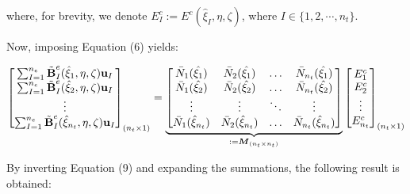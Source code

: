 \documentclass[12pt]{article}
\begin{document}
\noindent
where, for brevity, we denote $E^c_I := E^c (\hat{\xi}_I,\eta,\zeta)$, where $I \in \{ 1,2,\cdots, n_t \}$.

Now, imposing Equation (6) yields:

\begin{equation}
\begin{bmatrix}
\sum_{I=1}^{n_e} \tilde{\text{\bf{B}}}_I^e (\hat{\xi}_1, \eta, \zeta) \text{\bf{u}}_I\\
\sum_{I=1}^{n_e} \tilde{\text{\bf{B}}}_I^e (\hat{\xi}_2, \eta, \zeta) \text{\bf{u}}_I\\
\vdots \\
\sum_{I=1}^{n_e} \tilde{\text{\bf{B}}}_I^e (\hat{\xi}_{n_t}, \eta, \zeta) \text{\bf{u}}_I\\
\end{bmatrix}_{(n_t \times 1)} =
\underbrace{
\begin{bmatrix}
\bar{N}_1 (\hat{\xi_1}) & \bar{N}_2 (\hat{\xi_1}) & \ldots & \bar{N}_{n_t} (\hat{\xi_1})\\
\bar{N}_1 (\hat{\xi_2}) & \bar{N}_2 (\hat{\xi_2}) & \ldots & \bar{N}_{n_t} (\hat{\xi_2})\\
\vdots & \vdots & \ddots & \vdots \\
\bar{N}_1 (\hat{\xi}_{n_t}) & \bar{N}_2 (\hat{\xi}_{n_t}) & \ldots & \bar{N}_{n_t} (\hat{\xi}_{n_t})\\
\end{bmatrix}}_{:= \boldsymbol{M}_{(n_t \times n_t)}}
\begin{bmatrix}
E_1^c\\
E_2^c\\
\vdots \\
E_{n_t}^c\\
\end{bmatrix}_{(n_t \times 1)}
\end{equation}

By inverting Equation (9) and expanding the summations, the following result is obtained:
\end{document}
